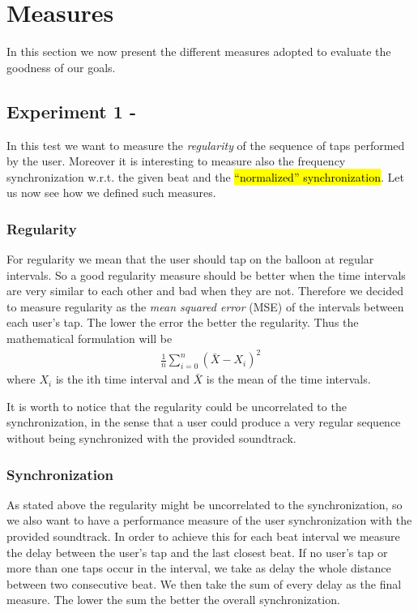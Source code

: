 \section{Measures}
\label{sec:measures}
In this section we now present the different measures adopted to evaluate the goodness of our goals.

\subsection{Experiment 1 - \testfirst}
In this test we want to measure the \emph{regularity} of the sequence of taps performed by the user. Moreover it is interesting to measure also the frequency synchronization w.r.t. the given beat and the \hl{``normalized'' synchronization}. 
Let us now see how we defined such measures.
\subsubsection{Regularity}
For regularity we mean that the user should tap on the balloon at regular intervals. So a good regularity measure should be better when the time intervals are very similar to each other and bad when they are not. Therefore we decided to measure regularity as the \emph{mean squared error} (MSE) of the intervals between each user's tap.
The lower the error the better the regularity.
Thus the mathematical formulation will be
\begin{align}
	\frac{1}{n}\displaystyle\sum\limits_{i=0}^n(\bar{X}-X_i)^2
\end{align}
where $X_i$ is the ith time interval and $\bar{X}$ is the mean of the time intervals.

It is worth to notice that the regularity could be uncorrelated to the synchronization, in the sense that a user could produce a very regular sequence without being synchronized with the provided soundtrack.

\subsubsection{Synchronization}
As stated above the regularity might be uncorrelated to the synchronization, so we also want to have a performance measure of the user synchronization with the provided soundtrack.
In order to achieve this for each beat interval we measure the delay between the user's tap and the last closest beat.
If no user's tap or more than one taps occur in the interval, we take as delay the whole distance between two consecutive beat.
We then take the sum of every delay as the final measure.
The lower the sum the better the overall synchronization.


